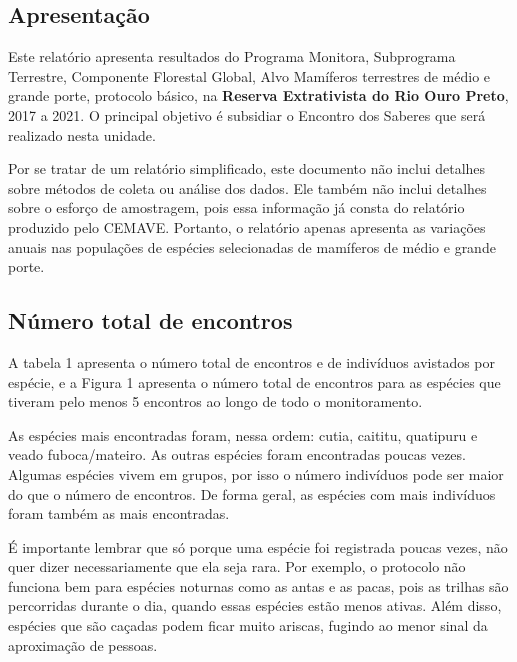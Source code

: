 \documentclass[]{tufte-handout}
\begin{document}
\hypertarget{apresentauxe7uxe3o}{%
\subsection{Apresentação}\label{apresentauxe7uxe3o}}

Este relatório apresenta resultados do Programa Monitora, Subprograma
Terrestre, Componente Florestal Global, Alvo Mamíferos terrestres de
médio e grande porte, protocolo básico, na \textbf{Reserva Extrativista
do Rio Ouro Preto}, 2017 a 2021. O principal objetivo é subsidiar o
Encontro dos Saberes que será realizado nesta unidade.

Por se tratar de um relatório simplificado, este documento não inclui
detalhes sobre métodos de coleta ou análise dos dados. Ele também não
inclui detalhes sobre o esforço de amostragem, pois essa informação já
consta do relatório produzido pelo CEMAVE. Portanto, o relatório apenas
apresenta as variações anuais nas populações de espécies selecionadas de
mamíferos de médio e grande porte.

\hypertarget{nuxfamero-total-de-encontros}{%
\subsection{Número total de
encontros}\label{nuxfamero-total-de-encontros}}

A tabela 1 apresenta o número total de encontros e de indivíduos
avistados por espécie, e a Figura 1 apresenta o número total de
encontros para as espécies que tiveram pelo menos 5 encontros ao longo
de todo o monitoramento.

As espécies mais encontradas foram, nessa ordem: cutia, caititu,
quatipuru e veado fuboca/mateiro. As outras espécies foram encontradas
poucas vezes. Algumas espécies vivem em grupos, por isso o número
indivíduos pode ser maior do que o número de encontros. De forma geral,
as espécies com mais indivíduos foram também as mais encontradas.

É importante lembrar que só porque uma espécie foi registrada poucas
vezes, não quer dizer necessariamente que ela seja rara. Por exemplo, o
protocolo não funciona bem para espécies noturnas como as antas e as
pacas, pois as trilhas são percorridas durante o dia, quando essas
espécies estão menos ativas. Além disso, espécies que são caçadas podem
ficar muito ariscas, fugindo ao menor sinal da aproximação de pessoas.
\end{document}
